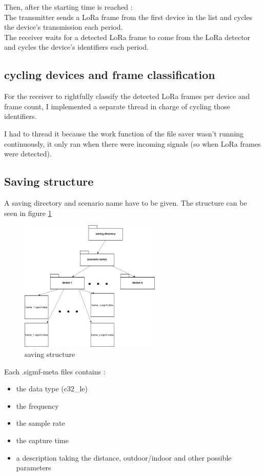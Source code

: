 \documentclass[a4paper, 12pt]{article}
\begin{document}
Then, after the starting time is reached :\\
The transmitter sends a LoRa frame from the first device in the list and cycles the device's transmission each period.\\
The receiver waits for a detected LoRa frame to come from the LoRa detector and cycles the device's identifiers each period.

\subsection{cycling devices and frame classification}
For the receiver to rightfully classify the detected LoRa frames per device and frame count, I implemented a separate thread in charge of cycling those identifiers.

I had to thread it because the work function of the file saver wasn't running continuously, it only ran when there were incoming signals (so when LoRa frames were detected).

\subsection{Saving structure}
A saving directory and scenario name have to be given. 
The structure can be seen in figure \ref{savestruct}

\begin{figure}[H]
  \begin{center}
    \includegraphics[width=0.6\textwidth]{images/save.jpg}
  \end{center}
  \caption{saving structure}\label{savestruct}
\end{figure}

Each .sigmf-meta files contains :
\begin{itemize}
  \item the data type (c32\_le)
  \item the frequency
  \item the sample rate
  \item the capture time
  \item a description taking the distance, outdoor/indoor and other possible parameters
\end{itemize}
\end{document}
